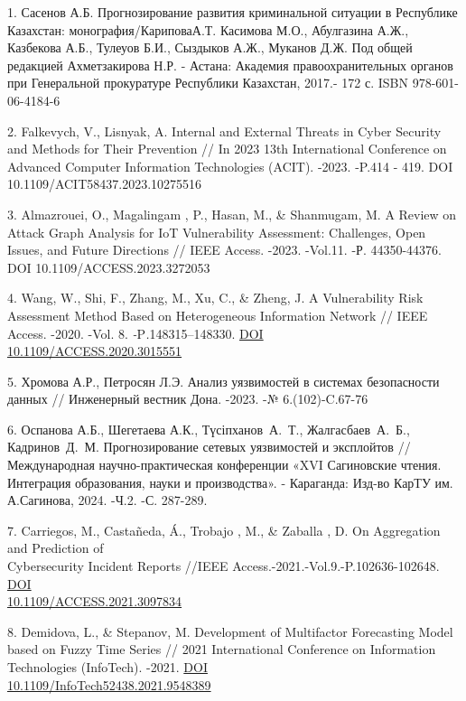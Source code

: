 \begin{references}
1. Сасенов А.Б. Прогнозирование развития криминальной ситуации в
Республике Казахстан: монография/КариповаА.Т. Касимова М.О., Абулгазина
А.Ж., Казбекова А.Б., Тулеуов Б.И., Сыздыков А.Ж., Муканов Д.Ж. Под
общей редакцией Ахметзакирова Н.Р. - Астана: Академия правоохранительных
органов при Генеральной прокуратуре Республики Казахстан, 2017.- 172 с.
ISBN 978-601-06-4184-6

2. Falkevych, V., Lisnyak, A. Internal and External Threats in Cyber
Security and Methods for Their Prevention // In 2023 13th International
Conference on Advanced Computer Information Technologies (ACIT). -2023.
-P.414 - 419. DOI 10.1109/ACIT58437.2023.10275516

3. Almazrouei, O., Magalingam , P., Hasan, M., \& Shanmugam, M. A Review
on Attack Graph Analysis for IoT Vulnerability Assessment: Challenges,
Open Issues, and Future Directions // IEEE Access. -2023. -Vol.11. -Р.
44350-44376. DOI 10.1109/ACCESS.2023.3272053

4. Wang, W., Shi, F., Zhang, M., Xu, C., \& Zheng, J. A Vulnerability
Risk Assessment Method Based on Heterogeneous Information Network //
IEEE Access. -2020. -Vol. 8. \emph{-}P\emph{.}148315--148330.
\href{https://doi.org/10.1109/ACCESS.2020.3015551}{DOI\\
10.1109/ACCESS.2020.3015551}

5. Хромова А.Р., Петросян Л.Э. Анализ уязвимостей в системах безопасности
данных // Инженерный вестник Дона. -2023. -№ 6.(102)-C.67-76

6. Оспанова А.Б., Шегетаева А.К., Түсіпханов~А.~Т., Жалгасбаев~А.~Б.,
Кадринов~Д.~М. Прогнозирование сетевых уязвимостей и эксплойтов //
Международная научно-практическая конференции «XVI Сагиновские чтения.
Интеграция образования, науки и производства». - Караганда: Изд-во КарТУ
им. А.Сагинова, 2024. -Ч.2. -С. 287-289.

7. Carriegos, M., Castañeda, Á., Trobajo , M., \& Zaballa , D. On
Aggregation and Prediction of \\Cybersecurity Incident Reports //IEEE
Access.-2021.-Vol.9.-P.102636-102648.
\href{https://doi.org/10.1109/ACCESS.2021.3097834}{DOI\\
10.1109/ACCESS.2021.3097834}

8. Demidova, L., \& Stepanov, M. Development of Multifactor Forecasting
Model based on Fuzzy Time Series // 2021 International Conference on
Information Technologies (InfoTech). -2021.
\href{https://doi.org/10.1109/InfoTech52438.2021.9548389}{DOI\\
10.1109/InfoTech52438.2021.9548389}


\end{references}
